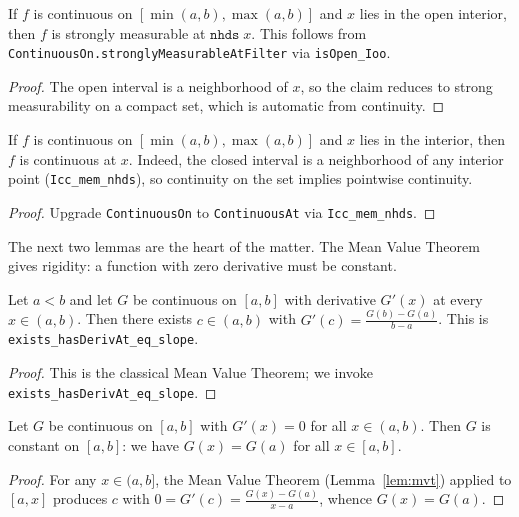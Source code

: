 \begin{lemma}
    \label{lem:strongly_measurable_interior}

    If $f$ is continuous on $[\min(a,b), \max(a,b)]$ and $x$ lies in the open interior, then $f$ is strongly measurable at $\texttt{nhds}\; x$. This follows from \texttt{ContinuousOn.stronglyMeasurableAtFilter} via \texttt{isOpen\_Ioo}.
\end{lemma}
\begin{proof}
    The open interval is a neighborhood of $x$, so the claim reduces to strong measurability on a compact set, which is automatic from continuity.
\end{proof}

\begin{lemma}
    \label{lem:continuous_at_interior}

    If $f$ is continuous on $[\min(a,b), \max(a,b)]$ and $x$ lies in the interior, then $f$ is continuous at $x$. Indeed, the closed interval is a neighborhood of any interior point (\texttt{Icc\_mem\_nhds}), so continuity on the set implies pointwise continuity.
\end{lemma}
\begin{proof}
    Upgrade \texttt{ContinuousOn} to \texttt{ContinuousAt} via \texttt{Icc\_mem\_nhds}.
\end{proof}

The next two lemmas are the heart of the matter. The Mean Value Theorem gives rigidity: a function with zero derivative must be constant.

\begin{lemma}
    \label{lem:mvt}

    Let $a < b$ and let $G$ be continuous on $[a,b]$ with derivative $G'(x)$ at every $x \in (a,b)$. Then there exists $c \in (a,b)$ with $G'(c) = \frac{G(b) - G(a)}{b - a}$. This is \texttt{exists\_hasDerivAt\_eq\_slope}.
\end{lemma}
\begin{proof}
    This is the classical Mean Value Theorem; we invoke \texttt{exists\_hasDerivAt\_eq\_slope}.
\end{proof}

\begin{lemma}
    \label{lem:zero_deriv_constant}

    Let $G$ be continuous on $[a,b]$ with $G'(x) = 0$ for all $x \in (a,b)$. Then $G$ is constant on $[a,b]$: we have $G(x) = G(a)$ for all $x \in [a,b]$.
\end{lemma}
\begin{proof}
    For any $x \in (a,b]$, the Mean Value Theorem (Lemma~\ref{lem:mvt}) applied to $[a,x]$ produces $c$ with $0 = G'(c) = \frac{G(x) - G(a)}{x - a}$, whence $G(x) = G(a)$.
\end{proof}

